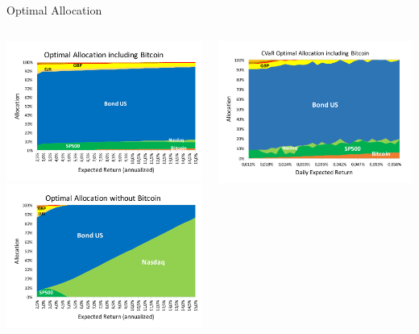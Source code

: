 \documentclass[c, 10pt]{beamer}
\begin{document}
\begin{frame}{Optimal Allocation}
\begin{columns}
	\begin{column}{0.5\textwidth}
		\includegraphics[width=\textwidth]{Images/markowitz_allocation}\\
		\includegraphics[width=\textwidth]{Images/markowitz_allocation_no_btc}
	\end{column}
	\begin{column}{0.5\textwidth}  %
		\includegraphics[width=\textwidth]{Images/cvar_allocation}\\

\end{column}
\end{columns}
\end{frame}
\end{document}
